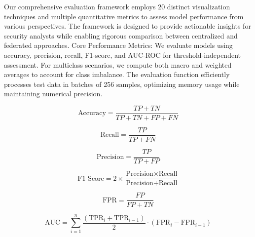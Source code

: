 



Our comprehensive evaluation framework employs 20 distinct visualization techniques and multiple quantitative metrics to assess model performance from various perspectives. The framework is designed to provide actionable insights for security analysts while enabling rigorous comparison between centralized and federated approaches.
Core Performance Metrics: We evaluate models using accuracy, precision, recall, F1-score, and AUC-ROC for threshold-independent assessment. For multiclass scenarios, we compute both macro and weighted averages to account for class imbalance. The evaluation function efficiently processes test data in batches of 256 samples, optimizing memory usage while maintaining numerical precision.

\begin{equation}
	\text{Accuracy} = \frac{TP + TN}{TP + TN + FP + FN}
	\label{eq:accuracy}
\end{equation}

\begin{equation}
	\text{Recall} = \frac{TP}{TP + FN}
	\label{eq:recall}
\end{equation}

\begin{equation}
	\text{Precision} = \frac{TP}{TP + FP}
	\label{eq:precision}
\end{equation}

\begin{equation}
	\text{F1 Score} = 2 \times \frac{\text{Precision} \times \text{Recall}}{\text{Precision} + \text{Recall}}
	\label{eq:f1_score}
\end{equation}

\begin{equation}
	\text{FPR} = \frac{FP}{FP + TN}
	\label{eq:fpr}
\end{equation}

\begin{equation}
	\text{AUC} = \sum_{i=1}^{n} \frac{(\text{TPR}_i + \text{TPR}_{i-1})}{2} \cdot (\text{FPR}_i - \text{FPR}_{i-1})
	\label{eq:auc}
\end{equation}